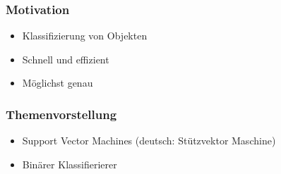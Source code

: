 \begin{frame}
    \frametitle{Motivation}

    \begin{figure}[h]
    \end{figure}

    \vspace{3mm}

    \begin{itemize}
        \item Klassifizierung von Objekten
        \item Schnell und effizient
        \item Möglichst genau
    \end{itemize}
\end{frame}

\begin{frame}
    \frametitle{Themenvorstellung}

    \begin{figure}[h]
    \end{figure}

    \vspace{3mm}

    \begin{itemize}
        \item Support Vector Machines (deutsch: Stützvektor Maschine)
        \item Binärer Klassifierierer
    \end{itemize}
\end{frame}

